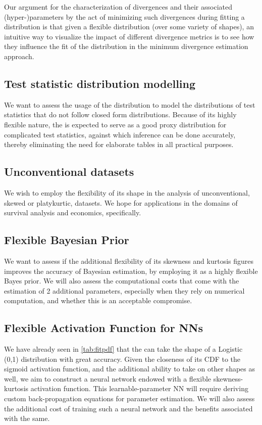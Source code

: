 Our argument for the characterization of divergences and their associated (hyper-)parameters by the act of minimizing such divergences during fitting a distribution is that given a flexible distribution (over some variety of shapes), an intuitive way to visualize the impact of different divergence metrics is to see how they influence the fit of the distribution in the minimum divergence estimation approach.

\subsection{Test statistic distribution modelling}
We want to assess the usage of the distribution to model the distributions of test statistics that do not follow closed form distributions. Because of its highly flexible nature, the \sindist{} is expected to serve as a good proxy distribution for complicated test statistics, against which inference can be done accurately, thereby eliminating the need for elaborate tables in all practical purposes.

\subsection{Unconventional datasets}
We wish to employ the flexibility of its shape in the analysis of unconventional, skewed or platykurtic, datasets. We hope for applications in the domains of survival analysis and economics, specifically.

\subsection{Flexible Bayesian Prior}
We want to assess if the additional flexibility of its skewness and kurtosis figures improves the accuracy of Bayesian estimation, by employing it as a highly flexible Bayes prior. We will also assess the computational costs that come with the estimation of 2 additional parameters, especially when they rely on numerical computation, and whether this is an acceptable compromise.

\subsection{Flexible Activation Function for NNs}
We have already seen in \autoref{tab:fitpdf} that the \sindist{} can take the shape of a Logistic (0,1) distribution with great accuracy. Given the closeness of its CDF to the sigmoid activation function, and the additional ability to take on other shapes as well, we aim to construct a neural network endowed with a flexible skewness-kurtosis activation function. This learnable-parameter NN will require deriving custom back-propagation equations for parameter estimation. We will also assess the additional cost of training such a neural network and the benefits associated with the same.